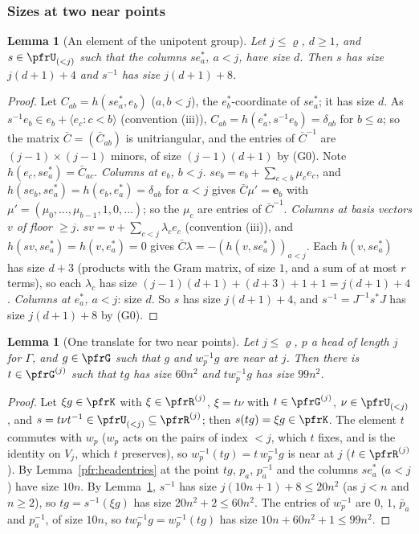 \documentclass[10pt]{amsart}
\newtheorem{lemma}[theorem]{Lemma}
\theoremstyle{definition}
\theoremstyle{remark}
\begin{document}
\subsubsection*{Sizes at two near points}
\begin{lemma}[An element of the unipotent group]\label{pfs:unisize}
Let $j\le\varrho$, $d\ge1$, and $s\in\pfrU_{(<j)}$ such that the columns $se_a^*$, $a<j$, have size $d$. Then $s$ has size
$j(d+1)+4$ and $s^{-1}$ has size $j(d+1)+8$.
\end{lemma}
\begin{proof}
Let $C_{ab}=h(se_a^*,e_b)$ ($a,b<j$), the $e_b^*$-coordinate of $se_a^*$; it has size $d$. As $s^{-1}e_b\in e_b+\langle e_c:c<b\rangle$
(convention (iii)), $C_{ab}=h(e_a^*,s^{-1}e_b)=\delta_{ab}$ for $b\le a$; so the matrix $\bar C=(\bar C_{ab})$ is unitriangular,
and the entries of $\bar C^{-1}$ are $(j-1)\times(j-1)$ minors, of size $(j-1)(d+1)$ by (G0). Note $h(e_c,se_a^*)=\bar C_{ac}$.
\emph{Columns at $e_b$, $b<j$.} $se_b=e_b+\sum_{c<b}\mu_ce_c$, and $h(se_b,se_a^*)=h(e_b,e_a^*)=\delta_{ab}$ for $a<j$ gives
$\bar C\mu'=\mathbf e_b$ with $\mu'=(\mu_0,\dots,\mu_{b-1},1,0,\dots)$; so the $\mu_c$ are entries of $\bar C^{-1}$. \emph{Columns at basis
vectors $v$ of floor $\ge j$.} $sv=v+\sum_{c<j}\lambda_ce_c$ (convention (iii)), and $h(sv,se_a^*)=h(v,e_a^*)=0$ gives
$\bar C\lambda=-(h(v,se_a^*))_{a<j}$. Each $h(v,se_a^*)$ has size $d+3$ (products with the Gram matrix, of size $1$, and a sum of
at most $r$ terms), so each $\lambda_c$ has size $(j-1)(d+1)+(d+3)+1+1=j(d+1)+4$. \emph{Columns at $e_a^*$, $a<j$}: size $d$.
So $s$ has size $j(d+1)+4$, and $s^{-1}=J^{-1}s^*J$ has size $j(d+1)+8$ by (G0).
\end{proof}

\begin{lemma}[One translate for two near points]\label{pfs:twosizes}
Let $j\le\varrho$, $p$ a head of length $j$ for $\Gamma$, and $g\in\pfrG$ such that $g$ and $w_p^{-1}g$ are near at $j$. Then there
is $t\in\pfrG^{(j)}$ such that $tg$ has size $60n^2$ and $tw_p^{-1}g$ has size $99n^2$.
\end{lemma}
\begin{proof}
Let $\xi g\in\pfrK$ with $\xi\in\pfrR^{(j)}$, $\xi=t\nu$ with $t\in\pfrG^{(j)}$, $\nu\in\pfrU_{(<j)}$, and $s=t\nu t^{-1}\in\pfrU_{(<j)}
\subseteq\pfrR^{(j)}$; then $s(tg)=\xi g\in\pfrK$. The element $t$ commutes with $w_p$ ($w_p$ acts on the pairs of index $<j$, which $t$
fixes, and is the identity on $V_j$, which $t$ preserves), so $w_p^{-1}(tg)=t\,w_p^{-1}g$ is near at $j$ ($t\in\pfrR^{(j)}$). By
Lemma~\ref{pfr:headentries} at the point $tg$, $p_a$, $p_a^{-1}$ and the columns $se_a^*$ ($a<j$) have size $10n$. By
Lemma~\ref{pfs:unisize}, $s^{-1}$ has size $j(10n+1)+8\le20n^2$ (as $j<n$ and $n\ge2$), so $tg=s^{-1}(\xi g)$ has size $20n^2+2\le60n^2$.
The entries of $w_p^{-1}$ are $0$, $1$, $\bar p_a$ and $p_a^{-1}$, of size $10n$, so $tw_p^{-1}g=w_p^{-1}(tg)$ has size
$10n+60n^2+1\le99n^2$.
\end{proof}
\end{document}
